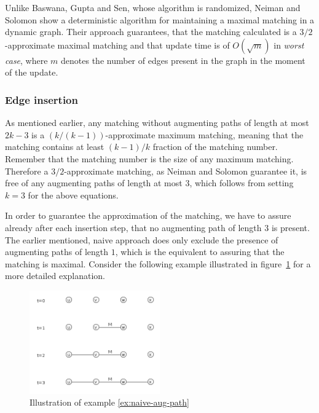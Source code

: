 \documentclass{article}      %
\begin{document}
Unlike Baswana, Gupta and Sen, whose algorithm is randomized, Neiman and Solomon show a deterministic algorithm for maintaining a maximal matching in a dynamic graph. Their approach guarantees, that the matching calculated is a $3/2$-approximate maximal matching and that update time is of $O(\sqrt{m})$ in \emph{worst case}, where $m$ denotes the number of edges present in the graph in the moment of the update.

\subsubsection{Edge insertion}
\label{sec:ns-edge-in}

As mentioned earlier, any matching without augmenting paths of length at most $2k-3$ is a $(k/(k-1))$-approximate maximum matching, meaning that the matching contains at least $(k-1)/k$ fraction of the matching number. Remember that the matching number is the size of any maximum matching. Therefore a $3/2$-approximate matching, as Neiman and Solomon guarantee it, is free of any augmenting paths of length at most $3$, which follows from setting $k=3$ for the above equations.

In order to guarantee the approximation of the matching, we have to assure already after each insertion step, that no augmenting path of length $3$ is present. The earlier mentioned, naive approach does only exclude the presence of augmenting paths of length $1$, which is the equivalent to assuring that the matching is maximal. Consider the following example illustrated in figure~\ref{fig:example-4-3-1} for a more detailed explanation.

\begin{figure}
\center 
\includegraphics[width=0.5\textwidth]{example-4-3-1.png}
\caption{Illustration of example \ref{ex:naive-aug-path}}
\label{fig:example-4-3-1}
\end{figure}
\end{document}
